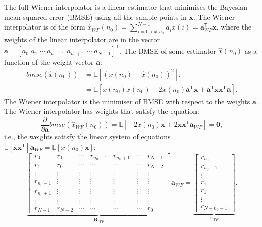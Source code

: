 \documentclass[11pt]{article}
\newcommand{\ba}{\mathbf{a}}
\newcommand{\bx}{\mathbf{x}}
\newcommand{\Ex}{\mathbb{E}}
\newcommand{\TT}{\mathsf{T}}
\newcommand{\zerovec}{\boldsymbol{0}}
\begin{document}
The full Wiener interpolator is a linear estimator that minimises the Bayesian mean-squared error (BMSE) using all the sample points in $\bx$. The Wiener interpolator is of the form $\hat{x}_{WF}(n_{0}) = \sum_{i=0, i\neq n_{0}}^{N-1} a_{i} x(i) = \ba_{WF}^\TT \bx$, where the weights of the linear interpolator are in the vector $\ba = [a_{0} \; a_{1} \; \cdots \; a_{n_{0}-1} \; a_{n_{0}+1} \; \cdots \; a_{N-1}]^{\TT}$. The BMSE of some estimator $\hat{x}(n_{0})$ as a function of the weight vector $\ba$:
\begin{equation}
\begin{split}
	bmse(\hat{x}(n_{0})) &= \Ex \left[ \left( x(n_{0}) - \hat{x}(n_{0}) \right)^{2} \right], \\
	&= \Ex \left[ x(n_{0})x(n_{0}) - 2x(n_{0}) \ba^{\TT}\bx + \ba^{\TT} \bx \bx^{\TT} \ba \right].
\end{split}
\label{eq:bmse}
\end{equation}
The Wiener interpolator is the minimiser of BMSE with respect to the weights $\ba$. The Wiener interpolator has weights that satisfy the equation:
\begin{equation}
	\frac{\partial}{\partial \ba} bmse(\hat{x}_{WF}(n_{0})) = \Ex \left[ -2 x(n_{0})\bx + 2\bx\bx^{\TT} \ba_{WF} \right] = \zerovec,
\end{equation}
i.e., the weights satisfy the linear system of equations $\Ex [\bx\bx^{\TT}] \ba_{WF} = \Ex[x(n_{0}) \bx]$:
\begin{equation}
	\underbrace{\begin{bmatrix}
		r_{0} & r_{1} & \cdots & r_{n_{0}-1} & r_{n_{0}+1} & \cdots & r_{N-1} \\
		r_{1} & r_{0} & \cdots & \cdots & \cdots & \cdots & r_{N-2} \\
		\vdots & \vdots & \vdots & \vdots & \vdots & \vdots & \vdots \\
		r_{n_{0}-1} & \vdots & \vdots & \vdots & \vdots & \vdots & \vdots \\
		r_{n_{0}+1} & \vdots & \vdots & \vdots & \vdots & \vdots & \vdots \\
		\vdots & \vdots & \vdots & \vdots & \vdots & \vdots & \vdots \\
		r_{N-1} & r_{N-2} & \cdots & \cdots & \cdots & \cdots & r_{0}
	\end{bmatrix}}_{\mathbf{R}_{WF}} \ba_{WF} = 
	\underbrace{\begin{bmatrix}
		r_{n_{0}} \\ r_{n_{0}-1} \\ \vdots \\ r_{1} \\ r_{1} \\ \vdots \\ r_{N-n_{0}-1}
	\end{bmatrix}}_{\mathbf{r}_{WF}}.
\label{eq:WFlinearSystem}
\end{equation}
\end{document}
